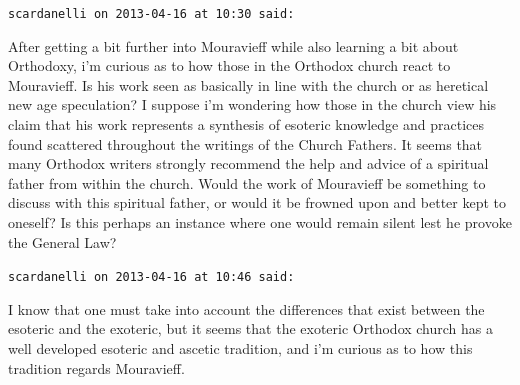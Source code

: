 \begin{footnotesize}
\begin{sffamily}
\hfill

\texttt{scardanelli on 2013-04-16 at 10:30 said:}

After getting a bit further into Mouravieff while also learning a bit about Orthodoxy, i'm curious as to how those in the Orthodox church react to Mouravieff. Is his work seen as basically in line with the church or as heretical new age speculation? I suppose i'm wondering how those in the church view his claim that his work represents a synthesis of esoteric knowledge and practices found scattered throughout the writings of the Church Fathers. It seems that many Orthodox writers strongly recommend the help and advice of a spiritual father from within the church. Would the work of Mouravieff be something to discuss with this spiritual father, or would it be frowned upon and better kept to oneself? Is this perhaps an instance where one would remain silent lest he provoke the General Law?

\hfill

\texttt{scardanelli on 2013-04-16 at 10:46 said:}

I know that one must take into account the differences that exist between the esoteric and the exoteric, but it seems that the exoteric Orthodox church has a well developed esoteric and ascetic tradition, and i'm curious as to how this tradition regards Mouravieff.

\hfill

\end{sffamily}
\end{footnotesize}

